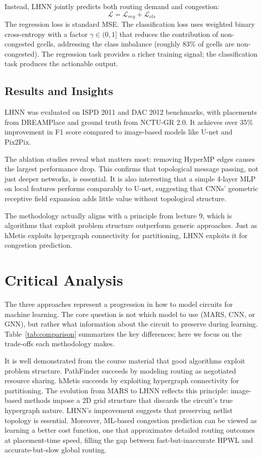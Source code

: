 \documentclass[sigconf]{acmart}
\begin{document}
Instead, LHNN jointly predicts both routing demand and congestion:
\begin{equation}
\mathcal{L} = \mathcal{L}_{reg} + \mathcal{L}_{cls}
\end{equation}
The regression loss is standard MSE. The classification loss uses 
weighted binary cross-entropy with a factor $\gamma \in (0,1]$ that 
reduces the contribution of non-congested gcells, addressing the class 
imbalance (roughly 83\% of gcells are non-congested). The regression 
task provides a richer training signal; the classification task produces 
the actionable output.

\subsection{Results and Insights}

LHNN was evaluated on ISPD 2011 and DAC 2012 benchmarks, with placements 
from DREAMPlace and ground truth from NCTU-GR 2.0. It achieves over 
35\% improvement in F1 score compared to image-based models like U-net 
and Pix2Pix.

The ablation studies reveal what matters most: removing HyperMP edges 
causes the largest performance drop. This confirms that topological 
message passing, not just deeper networks, is essential. It is also interesting that 
a simple 4-layer MLP on local features performs comparably to U-net, 
suggesting that CNNs' geometric receptive field expansion adds little 
value without topological structure.

The methodology actually aligns with a principle from lecture 9, which is algorithms that 
exploit problem structure outperform generic approaches. Just as hMetis 
exploits hypergraph connectivity for partitioning, LHNN exploits it for 
congestion prediction.

\section{Critical Analysis}

The three approaches represent a progression in how to model circuits 
for machine learning. The core question is not which model to use 
(MARS, CNN, or GNN), but rather what information about the circuit 
to preserve during learning. Table~\ref{tab:comparison} summarizes 
the key differences; here we focus on the trade-offs each methodology 
makes.

It is well demonstrated from the course material that good algorithms exploit problem structure. 
PathFinder succeeds by modeling routing as negotiated resource sharing. 
hMetis succeeds by exploiting hypergraph connectivity for partitioning. 
The evolution from MARS to LHNN reflects this principle: image-based 
methods impose a 2D grid structure that discards the circuit's true 
hypergraph nature. LHNN's improvement suggests that preserving netlist 
topology is essential. Moreover, ML-based congestion prediction can be 
viewed as learning a better cost function, one that approximates detailed 
routing outcomes at placement-time speed, filling the gap between 
fast-but-inaccurate HPWL and accurate-but-slow global routing.
\end{document}
